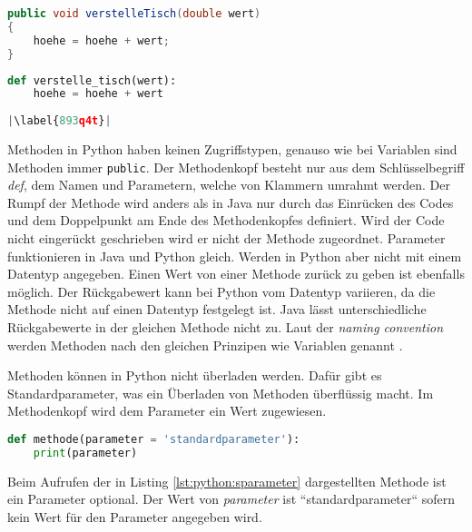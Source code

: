 \begin{minipage}{.5\linewidth}
\begin{lstlisting}[language=java,caption={Methoden in Java},captionpos=b,label={lst:java:methode},frame=none]
public void verstelleTisch(double wert)
{
    hoehe = hoehe + wert;
}
\end{lstlisting}
\end{minipage}
\begin{minipage}{.5\linewidth}
\begin{lstlisting}[language=python,caption={Methode in Python},captionpos=b,label={lst:python:methode},frame=l,escapechar=|]
def verstelle_tisch(wert):
    hoehe = hoehe + wert
    
|\label{893q4t}|
\end{lstlisting}
\end{minipage}

Methoden in Python haben keinen Zugriffstypen, genauso wie bei Variablen sind Methoden immer \texttt{public}. Der Methodenkopf besteht nur aus dem Schlüsselbegriff \textit{def}, dem Namen und Parametern, welche von Klammern umrahmt werden. Der Rumpf der Methode wird anders als in Java nur durch das Einrücken des Codes und dem Doppelpunkt am Ende des Methodenkopfes definiert. Wird der Code nicht eingerückt geschrieben wird er nicht der Methode zugeordnet. Parameter funktionieren in Java und Python gleich. Werden in Python aber nicht mit einem Datentyp angegeben. Einen Wert von einer Methode zurück zu geben ist ebenfalls möglich. Der Rückgabewert kann bei Python vom Datentyp variieren, da die Methode nicht auf einen Datentyp festgelegt ist. Java lässt unterschiedliche Rückgabewerte in der gleichen Methode nicht zu. Laut der \textit{naming convention} werden Methoden nach den gleichen Prinzipen wie Variablen genannt \cite{Ims:h-s}\cite{Microsoft:CapCon}. \cite{Python3:Buch}\cite{Louis:2010}
\par
Methoden können in Python nicht überladen werden. Dafür gibt es Standardparameter, was ein Überladen von Methoden überflüssig macht. Im Methodenkopf wird dem Parameter ein Wert zugewiesen.

\begin{lstlisting}[language=python,caption={Methode in Python mit Standartparameter},captionpos=b,label={lst:python:sparameter},frame=none]
def methode(parameter = 'standardparameter'):
    print(parameter)
\end{lstlisting}

Beim Aufrufen der in Listing \ref{lst:python:sparameter} dargestellten Methode ist ein Parameter optional. Der Wert von \textit{parameter} ist “standardparameter“ sofern kein Wert für den Parameter angegeben wird.\par

